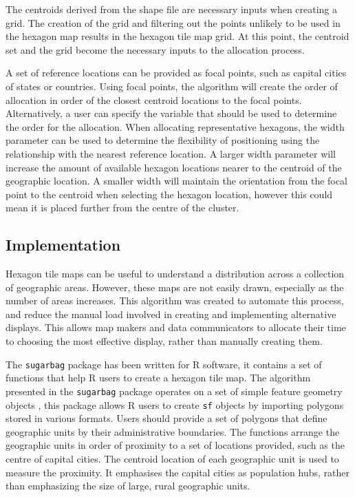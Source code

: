 The centroids derived from the shape file are necessary inputs when
creating a grid. The creation of the grid and filtering out the points
unlikely to be used in the hexagon map results in the hexagon tile map
grid. At this point, the centroid set and the grid become the necessary
inputs to the allocation process.

A set of reference locations can be provided as focal points, such as
capital cities of states or countries. Using focal points, the algorithm
will create the order of allocation in order of the closest centroid
locations to the focal points. Alternatively, a user can specify the
variable that should be used to determine the order for the allocation.
When allocating representative hexagons, the width parameter can be used
to determine the flexibility of positioning using the relationship with
the nearest reference location. A larger width parameter will increase
the amount of available hexagon locations nearer to the centroid of the
geographic location. A smaller width will maintain the orientation from
the focal point to the centroid when selecting the hexagon location,
however this could mean it is placed further from the centre of the
cluster.

\hypertarget{implementation}{%
\subsection{Implementation}\label{implementation}}

Hexagon tile maps can be useful to understand a distribution across a
collection of geographic areas. However, these maps are not easily
drawn, especially as the number of areas increases. This algorithm was
created to automate this process, and reduce the manual load involved in
creating and implementing alternative displays. This allows map makers
and data communicators to allocate their time to choosing the most
effective display, rather than manually creating them.

The \texttt{sugarbag} package has been written for R software, it
contains a set of functions that help R users to create a hexagon tile
map. The algorithm presented in the \texttt{sugarbag} package operates
on a set of simple feature geometry objects \citep{sf}, this package
allows R users to create \texttt{sf} objects by importing polygons
stored in various formats. Users should provide a set of polygons that
define geographic units by their administrative boundaries. The
functions arrange the geographic units in order of proximity to a set of
locations provided, such as the centre of capital cities. The centroid
location of each geographic unit is used to measure the proximity. It
emphasises the capital cities as population hubs, rather than
emphasizing the size of large, rural geographic units.

